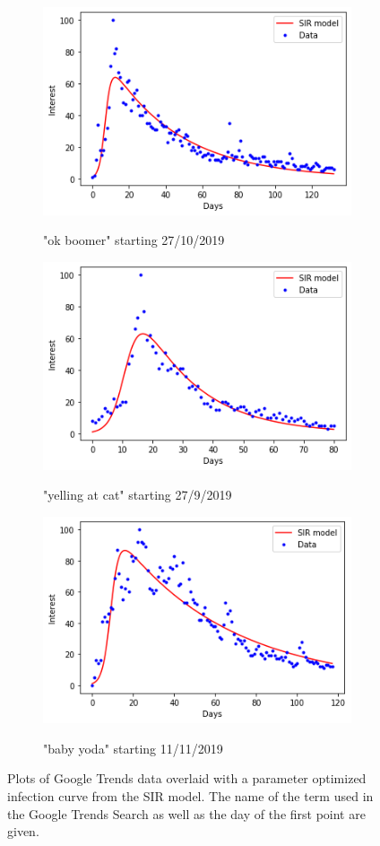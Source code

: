 \documentclass[12pt, letterpaper]{article}
\begin{document}
\begin{figure}[htbp!]
\begin{subfigure}{.5\textwidth}
    \label{fig:sfig1}
\end{subfigure}
\begin{subfigure}{.5\textwidth}
    \centering
    \caption{"ok boomer" starting 27/10/2019}
    \includegraphics[width=0.8\linewidth]{boomer}
    \label{fig:sfig1}
\end{subfigure}
\begin{subfigure}{.5\textwidth}
    \centering
    \caption{"yelling at cat" starting 27/9/2019}
    \includegraphics[width=0.8\linewidth]{cat}
    \label{fig:sfig1}
\end{subfigure}
\begin{subfigure}{.5\textwidth}
    \centering
    \caption{"baby yoda" starting 11/11/2019}
    \includegraphics[width=0.8\linewidth]{yoda}
    \label{fig:sfig1}
\end{subfigure}
\caption{Plots of Google Trends data overlaid with a parameter optimized infection curve from the SIR model. The name of the term used in the Google Trends Search as well as the day of the first point are given.}
\label{fig:fig}
\end{figure}
\end{document}
